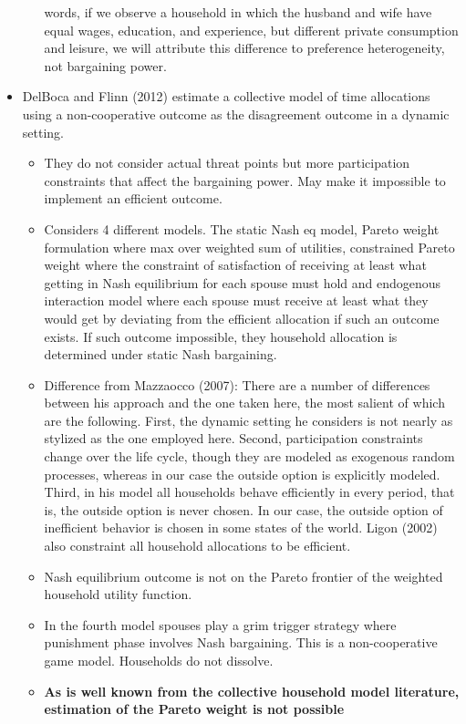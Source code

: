 \begin{itemize}
\begin{itemize}
words, if we observe a household in which the husband and wife have equal wages, education, and experience, but different private consumption and leisure, we will attribute this difference to preference heterogeneity, not bargaining power.
\end{itemize} 
\item DelBoca and Flinn (2012) estimate a collective model of time allocations using a non-cooperative outcome as the disagreement outcome in a dynamic setting.
\begin{itemize}
\item They do not consider actual threat points but more participation constraints that affect the bargaining power. May make it impossible to implement an efficient outcome.
\item Considers 4 different models. The static Nash eq model, Pareto weight formulation where max over weighted sum of utilities, 	constrained Pareto weight where the constraint of satisfaction of receiving at least what getting in Nash equilibrium for each spouse must hold and endogenous interaction model where each spouse must receive at least what they would get by deviating from the efficient allocation if such an outcome exists. If such outcome impossible, they household allocation is determined under static Nash bargaining.
\item Difference from Mazzaocco (2007): There are a number of differences between his approach and the one taken
here, the most salient of which are the following. First, the dynamic setting he considers is not nearly as stylized as the one employed here. Second, participation constraints change over the life cycle, though they are modeled as exogenous
random processes, whereas in our case the outside option is explicitly modeled. Third, in his model all households behave efficiently in every period, that is, the outside option is never chosen. In our case, the outside option of inefficient behavior
is chosen in some states of the world. Ligon (2002) also constraint all household allocations to be efficient.
\item Nash equilibrium outcome is not on the Pareto frontier of the weighted household utility function.
\item In the fourth model spouses play a grim trigger strategy where punishment phase involves Nash bargaining. This is a non-cooperative game model. Households do not dissolve.
\item \textbf{As is well known from the collective household model literature, estimation of the Pareto weight is not possible
}
\end{itemize}
\end{itemize}
